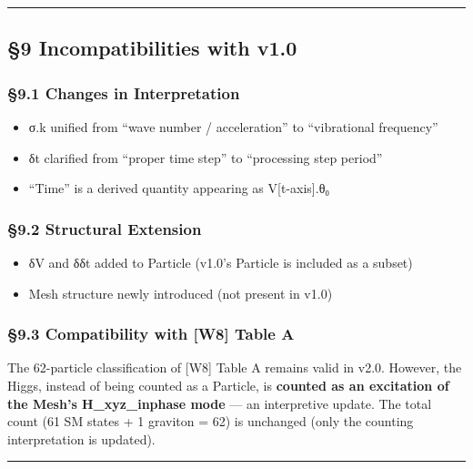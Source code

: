 \documentclass[a4paper,11pt]{article}
\providecommand{\tightlist}{\setlength{\itemsep}{0pt}\setlength{\parskip}{0pt}}
\begin{document}
\begin{center}\rule{0.5\linewidth}{0.5pt}\end{center}

\subsection{§9 Incompatibilities with
v1.0}\label{incompatibilities-with-v1.0}

\subsubsection{§9.1 Changes in
Interpretation}\label{changes-in-interpretation}

\begin{itemize}
\tightlist
\item
  σ.k unified from ``wave number / acceleration'' to ``vibrational
  frequency''
\item
  δt clarified from ``proper time step'' to ``processing step period''
\item
  ``Time'' is a derived quantity appearing as V{[}t-axis{]}.θ₀
\end{itemize}

\subsubsection{§9.2 Structural Extension}\label{structural-extension}

\begin{itemize}
\tightlist
\item
  δV and δδt added to Particle (v1.0's Particle is included as a subset)
\item
  Mesh structure newly introduced (not present in v1.0)
\end{itemize}

\subsubsection{§9.3 Compatibility with {[}W8{]} Table
A}\label{compatibility-with-w8-table-a}

The 62-particle classification of {[}W8{]} Table A remains valid in
v2.0. However, the Higgs, instead of being counted as a Particle, is
\textbf{counted as an excitation of the Mesh's H\_xyz\_inphase mode} ---
an interpretive update. The total count (61 SM states + 1 graviton = 62)
is unchanged (only the counting interpretation is updated).

\begin{center}\rule{0.5\linewidth}{0.5pt}\end{center}
\end{document}
